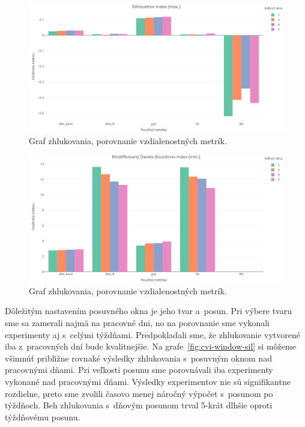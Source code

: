 \documentclass[a4paper,twoside,slovak,12pt,appendix]{article}
\begin{document}
\begin{figure}[htbp]
  \centering
  \includegraphics[width=\textwidth]{cvi/metric_comparison/201902271851-Sil-metric_comparison.png}
  \caption{Graf zhlukovania, porovnanie vzdialenostných metrík.}
	\label{fig:cvi-metric-sil}
\end{figure}
\begin{figure}[htbp]
  \centering
  \includegraphics[width=\textwidth]{cvi/metric_comparison/201902271851-DBstar-metric_comparison.png}
  \caption{Graf zhlukovania, porovnanie vzdialenostných metrík.}
	\label{fig:cvi-metric-dbs}
\end{figure}

Dôležitým nastavením posuvného okna je jeho tvar a~posun. Pri výbere tvaru sme
sa zamerali najmä na pracovné dni, no na porovnanie sme vykonali experimenty aj
s~celými týždňami. Predpokladali sme, že zhlukovanie vytvorené iba z~pracovných
dní bude kvalitnejšie. Na grafe~\ref{fig:cvi-window-sil} si môžeme všimnúť
približne rovnaké výsledky zhlukovania s~posuvným oknom nad pracovnými dňami.
Pri veľkosti posunu sme porovnávali iba experimenty vykonané nad pracovnými
dňami. Výsledky experimentov nie sú signifikantne rozdielne, preto sme zvolili
časovo menej náročný výpočet s~posunom po týždňoch. Beh zhlukovania s~dňovým
posunom trval 5-krát dlhšie oproti týždňovému posunu.
\end{document}
